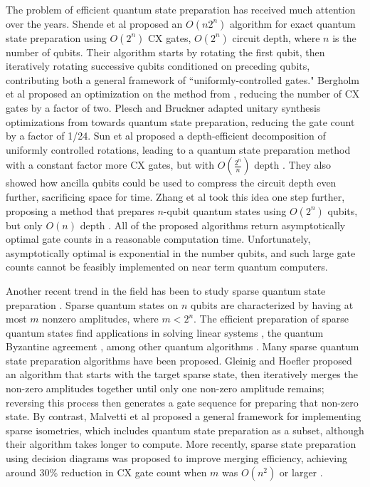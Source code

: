 \documentclass{article}
\begin{document}
The problem of efficient quantum state preparation has received much attention
over the years. Shende et al \cite{1629135} proposed an $O(n2^n)$ algorithm
for exact quantum state preparation using $O(2^n)$ CX gates, $O(2^n)$ circuit
depth, where $n$ is the number of qubits. Their algorithm starts by rotating 
the first qubit, then iteratively 
rotating successive qubits conditioned on preceding qubits, contributing both
a general framework of ``uniformly-controlled gates." Bergholm et al
\cite{bergholm2005quantum} proposed an optimization on the method from \cite{1629135}, reducing the number of
CX gates by a factor of two. Plesch and Bruckner \cite{PhysRevA.83.032302} 
adapted unitary 
synthesis optimizations from \cite{1629135} towards quantum state preparation,
reducing the gate count by a factor of 1/24. Sun et al proposed a 
depth-efficient decomposition of uniformly controlled rotations, leading to a 
quantum state preparation method with a constant factor more CX gates, but with
$O(\frac{2^n}{n})$ depth \cite{10044235}. They also showed how ancilla qubits could be used to
compress the circuit depth even further, sacrificing space for time. Zhang et al
took this idea one step further, proposing a method that prepares
$n$-qubit quantum states using $O(2^n)$ qubits, but only $O(n)$ depth \cite{zhang2022quantum}. All of
the proposed algorithms return asymptotically optimal gate counts in a
reasonable computation time. Unfortunately, asymptotically optimal is
exponential in the number qubits, and such large gate counts cannot be
feasibly implemented on near term quantum computers.

Another recent trend in the field has been to study sparse quantum state
preparation \cite{PhysRevA.106.022617}. Sparse quantum states on $n$ qubits are characterized by having
at most $m$ nonzero amplitudes, where $m < 2^n$. The efficient
preparation of sparse quantum states find applications in solving linear
systems \cite{PhysRevLett.103.150502}, the quantum Byzantine agreement \cite{10.1145/1060590.1060662}, among other quantum algorithms \cite{9272350}.
Many sparse quantum state preparation algorithms have been proposed.
Gleinig and Hoefler \cite{10.1109/DAC18074.2021.9586240} proposed an algorithm that starts with the
target sparse state, then iteratively merges the non-zero amplitudes together
until only one non-zero amplitude remains; reversing this process then generates
a gate sequence for preparing that non-zero state. By contrast, Malvetti et al
\cite{Malvetti2021quantumcircuits} proposed a general framework for implementing sparse isometries, which
includes quantum state preparation as a subset, although their algorithm takes
longer to compute. More recently, sparse state preparation using decision
diagrams was proposed to improve merging efficiency, achieving around 30\%
reduction in CX gate count when $m$ was $O(n^2)$ or larger \cite{PhysRevA.106.022617}. 
\end{document}

